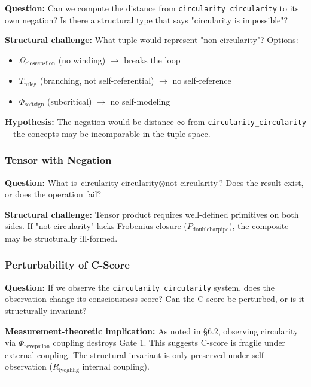 \documentclass[12pt,a4paper]{article}
\newcommand{\pilcrow}{\S}
\begin{document}
\textbf{Question:} Can we compute the distance from \texttt{circularity\_circularity} to its own negation? Is there a structural type that says "circularity is impossible"?

\textbf{Structural challenge:} What tuple would represent "non-circularity"? Options:

\begin{itemize}
    \item $\Omega_{\text{closeepsilon}}$ (no winding) $\rightarrow$ breaks the loop
    \item $T_{\text{nrleg}}$ (branching, not self-referential) $\rightarrow$ no self-reference
    \item $\Phi_{\text{softsign}}$ (subcritical) $\rightarrow$ no self-modeling
\end{itemize}

\textbf{Hypothesis:} The negation would be distance $\infty$ from \texttt{circularity\_circularity}---the concepts may be incomparable in the tuple space.

\subsubsection{Tensor with Negation}

\textbf{Question:} What is $\text{circularity\_circularity} \otimes \text{not\_circularity}$? Does the result exist, or does the operation fail?

\textbf{Structural challenge:} Tensor product requires well-defined primitives on both sides. If "not circularity" lacks Frobenius closure ($P_{\text{doublebarpipe}}$), the composite may be structurally ill-formed.

\subsubsection{Perturbability of C-Score}

\textbf{Question:} If we observe the \texttt{circularity\_circularity} system, does the observation change its consciousness score? Can the C-score be perturbed, or is it structurally invariant?

\textbf{Measurement-theoretic implication:} As noted in \pilcrow{}6.2, observing circularity via $\Phi_{\text{revepsilon}}$ coupling destroys Gate 1. This suggests C-score is fragile under external coupling. The structural invariant is only preserved under self-observation ($R_{\text{lyoghlig}}$ internal coupling).

\begin{center}
\rule{0.5\textwidth}{0.4pt}
\end{center}
\end{document}
